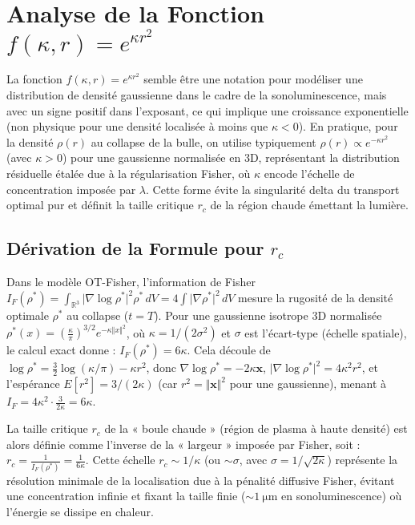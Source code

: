 \documentclass[a4paper,12pt]{article}
\begin{document}
\section{Analyse de la Fonction \( f(\kappa, r) = e^{\kappa r^2} \)}
La fonction \( f(\kappa, r) = e^{\kappa r^2} \) semble être une notation pour modéliser une distribution de densité gaussienne dans le cadre de la sonoluminescence, mais avec un signe positif dans l'exposant, ce qui implique une croissance exponentielle (non physique pour une densité localisée à moins que \( \kappa < 0 \)). En pratique, pour la densité \( \rho(r) \) au collapse de la bulle, on utilise typiquement \( \rho(r) \propto e^{-\kappa r^2} \) (avec \( \kappa > 0 \)) pour une gaussienne normalisée en 3D, représentant la distribution résiduelle étalée due à la régularisation Fisher, où \( \kappa \) encode l'échelle de concentration imposée par \( \lambda \). Cette forme évite la singularité delta du transport optimal pur et définit la taille critique \( r_c \) de la région chaude émettant la lumière.
\subsection{Dérivation de la Formule pour \( r_c \)}
Dans le modèle OT-Fisher, l'information de Fisher
\( I_F(\rho^*) = \int_{\mathbb{R}^3} \vert \nabla \log \rho^* \vert^2 \rho^* \, dV = 4 \int \vert \nabla \rho^* \vert^2 \, dV \)
mesure la rugosité de la densité optimale \( \rho^* \) au collapse (\( t = T \)).
Pour une gaussienne isotrope 3D normalisée
\( \rho^*(x) = \left( \frac{\kappa}{\pi} \right)^{3/2} e^{-\kappa \Vert x \Vert^2} \),
où \( \kappa = 1/(2 \sigma^2) \) et \( \sigma \) est l'écart-type (échelle spatiale),
le calcul exact donne : \( I_F(\rho^*) = 6 \kappa \).
Cela découle de
\( \log \rho^* = \frac{3}{2} \log (\kappa / \pi) - \kappa r^2 \),
donc
\( \nabla \log \rho^* = -2 \kappa \bm{x} \),
\( \vert \nabla \log \rho^* \vert^2 = 4 \kappa^2 r^2 \),
et l'espérance \( E[r^2] = 3/(2 \kappa) \) (car \( r^2 = \Vert \bm{x} \Vert^2 \) pour une gaussienne),
menant à
\( I_F = 4 \kappa^2 \cdot \frac{3}{2 \kappa} = 6 \kappa \).

La taille critique \( r_c \) de la « boule chaude » (région de plasma à haute densité)
est alors définie comme l'inverse de la « largeur » imposée par Fisher, soit :
\( r_c = \frac{1}{I_F(\rho^*)} = \frac{1}{6 \kappa} \).
Cette échelle \( r_c \sim 1 / \kappa \) (ou \( \sim \sigma \), avec \( \sigma = 1 / \sqrt{2 \kappa} \))
représente la résolution minimale de la localisation due à la pénalité diffusive Fisher,
évitant une concentration infinie et fixant la taille finie (\(\sim \SI{1}{\micro\meter}\) en sonoluminescence)
où l'énergie se dissipe en chaleur.
\end{document}
